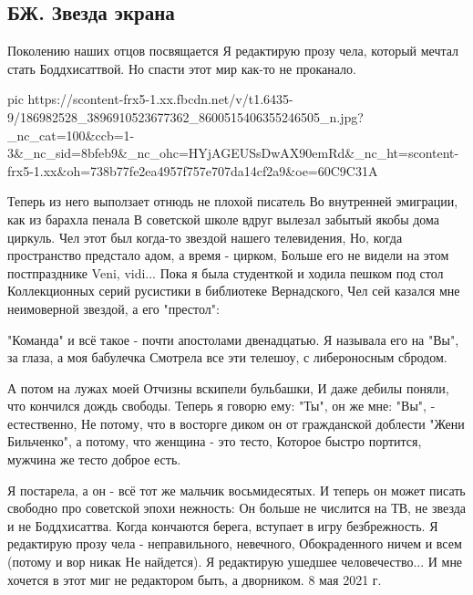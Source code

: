  
 
 
 
 
\subsection{БЖ. Звезда экрана}
\label{sec:16_05_2021.fb.bilchenko_evgenia.1.zvezda_ekrana}

Поколению наших отцов посвящается
Я редактирую прозу чела, который мечтал стать Боддхисаттвой.
Но спасти этот мир как-то не проканало.

\ifcmt
  pic https://scontent-frx5-1.xx.fbcdn.net/v/t1.6435-9/186982528_3896910523677362_8600515406355246505_n.jpg?_nc_cat=100&ccb=1-3&_nc_sid=8bfeb9&_nc_ohc=HYjAGEUSsDwAX90emRd&_nc_ht=scontent-frx5-1.xx&oh=738b77fe2ea4957f757e707da14cf2a9&oe=60C9C31A
\fi

Теперь из него выползает отнюдь не плохой писатель
Во внутренней эмиграции, как из барахла пенала
В советской школе вдруг вылезал забытый якобы дома циркуль.
Чел этот был когда-то звездой нашего телевидения,
Но, когда пространство предстало адом, а время - цирком,
Больше его не видели на этом постпразднике Veni, vidi...
Пока я была студенткой и ходила пешком под стол
Коллекционных серий русистики в библиотеке Вернадского,
Чел сей казался мне неимоверной звездой, а его "престол":

"Команда" и всё такое - почти апостолами двенадцатью.
Я называла его на "Вы", за глаза, а моя бабулечка
Смотрела все эти телешоу, с либероносным сбродом.

А потом на лужах моей Отчизны вскипели бульбашки,
И даже дебилы поняли, что кончился дождь свободы.
Теперь я говорю ему: "Ты", он же мне: "Вы", - естественно,
Не потому, что в восторге диком он от гражданской доблести
"Жени Бильченко", а потому, что женщина - это тесто,
Которое быстро портится, мужчина же тесто доброе есть.

Я постарела, а он - всё тот же мальчик восьмидесятых.
И теперь он может писать свободно про советской эпохи нежность:
Он больше не числится на ТВ, не звезда и не Боддхисаттва.
Когда кончаются берега, вступает в игру безбрежность.
Я редактирую прозу чела - неправильного, невечного,
Обокраденного ничем и всем (потому и вор никак
Не найдется). Я редактирую ушедшее человечество...
И мне хочется в этот миг не редактором быть, а дворником.
8 мая 2021 г.
